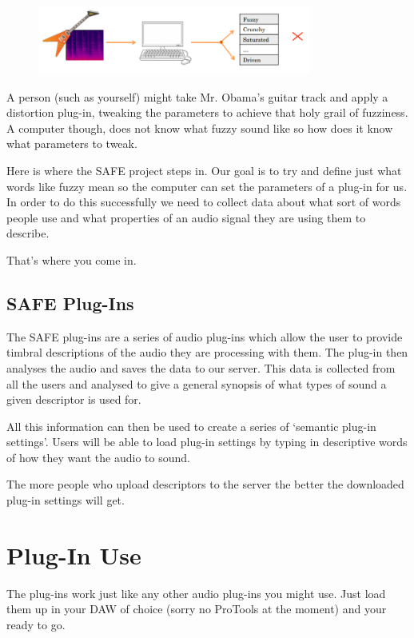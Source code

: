 \documentclass[a4paper]{article}
\begin{document}
		\begin{figure}[h!]
			\centering
			\includegraphics[width=0.8\textwidth]{Images/Computer.png}
		\end{figure}

		A person (such as yourself) might take Mr. Obama's guitar track and apply a distortion plug-in, tweaking the parameters to achieve that holy grail of fuzziness. A computer though, does not know what fuzzy sound like so how does it know what parameters to tweak.

		Here is where the SAFE project steps in. Our goal is to try and define just what words like fuzzy mean so the computer can set the parameters of a plug-in for us. In order to do this successfully we need to collect data about what sort of words people use and what properties of an audio signal they are using them to describe.

		That's where you come in.

	\subsection*{SAFE Plug-Ins}
		The SAFE plug-ins are a series of audio plug-ins which allow the user to provide timbral descriptions of the audio they are processing with them. The plug-in then analyses the audio and saves the data to our server. This data is collected from all the users and analysed to give a general synopsis of what types of sound a given descriptor is used for. 

		All this information can then be used to create a series of `semantic plug-in settings'. Users will be able to load plug-in settings by typing in descriptive words of how they want the audio to sound.

		The more people who upload descriptors to the server the better the downloaded plug-in settings will get.

\section*{Plug-In Use}
	The plug-ins work just like any other audio plug-ins you might use. Just load them up in your DAW of choice (sorry no ProTools at the moment) and your ready to go.
\end{document}
